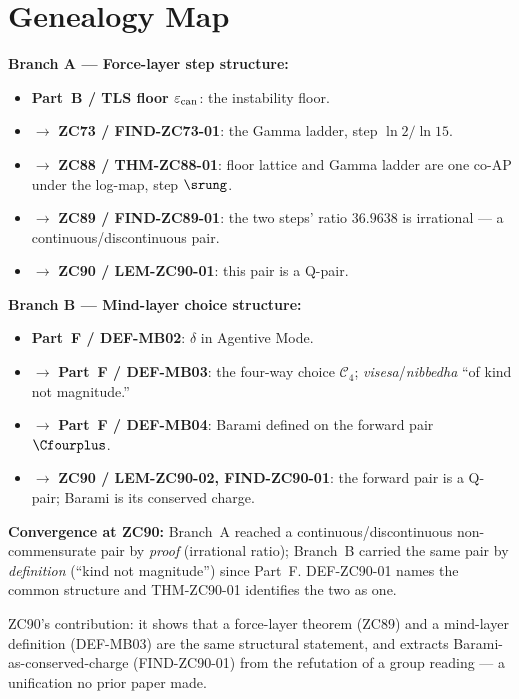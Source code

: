\documentclass[12pt, a4paper]{article}
\renewcommand{\epscan}{\varepsilon_{\rm can}}   %
\begin{document}
\section{Genealogy Map}
\label{sec:genealogy-zc90}
\begin{genealogybox}[title={How ZC90's Key Objects Trace Back}]

\textbf{Branch A --- Force-layer step structure:}
\begin{itemize}[leftmargin=2em, noitemsep]
  \item \textbf{Part~B / TLS floor $\epscan$}: the instability floor.
  \item $\to$ \textbf{ZC73 / FIND-ZC73-01}: the Gamma ladder, step
    $\ln2/\ln15$.
  \item $\to$ \textbf{ZC88 / THM-ZC88-01}: floor lattice and Gamma ladder
    are one co-AP under the log-map, step $\srung$.
  \item $\to$ \textbf{ZC89 / FIND-ZC89-01}: the two steps' ratio
    $36.9638$ is irrational --- a continuous/discontinuous pair.
  \item $\to$ \textbf{ZC90 / LEM-ZC90-01}: this pair is a Q-pair.
\end{itemize}

\textbf{Branch B --- Mind-layer choice structure:}
\begin{itemize}[leftmargin=2em, noitemsep]
  \item \textbf{Part~F / DEF-MB02}: $\delta$ in Agentive Mode.
  \item $\to$ \textbf{Part~F / DEF-MB03}: the four-way choice
    $\mathcal{C}_4$; \emph{visesa}/\emph{nibbedha} ``of kind not magnitude.''
  \item $\to$ \textbf{Part~F / DEF-MB04}: Barami defined on the forward
    pair $\Cfourplus$.
  \item $\to$ \textbf{ZC90 / LEM-ZC90-02, FIND-ZC90-01}: the forward pair
    is a Q-pair; Barami is its conserved charge.
\end{itemize}

\textbf{Convergence at ZC90:}
Branch~A reached a continuous/discontinuous non-commensurate pair by
\emph{proof} (irrational ratio); Branch~B carried the same pair by
\emph{definition} (``kind not magnitude'') since Part~F. DEF-ZC90-01
names the common structure and THM-ZC90-01 identifies the two as one.

ZC90's contribution: it shows that a force-layer theorem (ZC89) and a
mind-layer definition (DEF-MB03) are the same structural statement, and
extracts Barami-as-conserved-charge (FIND-ZC90-01) from the refutation of
a group reading --- a unification no prior paper made.
\end{genealogybox}
\end{document}
